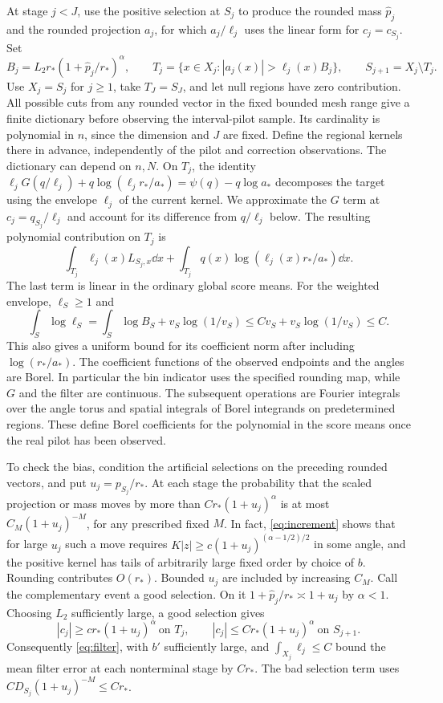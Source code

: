 At stage \(j<J\), use the positive selection at \(S_j\) to
produce the rounded mass \(\widehat p_j\) and the rounded
projection \(a_j\), for which \(a_j/\ell_j\) uses the linear
form for \(c_j=c_{S_j}\). Set
\[
 B_j=L_2 r_*(1+\widehat p_j/r_*)^\alpha,\qquad
 T_j=\{x\in X_j:|a_j(x)|>\ell_j(x)B_j\},\qquad
 S_{j+1}=X_j\setminus T_j .
\]
Use \(X_j=S_j\) for \(j\ge1\), take \(T_J=S_J\),
and let null regions have zero contribution.
All possible cuts from any rounded vector in the fixed
bounded mesh range give a finite dictionary before observing
the interval-pilot sample. Its cardinality is polynomial in \(n\), since
the dimension and \(J\) are fixed. Define the regional kernels
there in advance, independently of the pilot and correction
observations. The dictionary can depend on \(n,N\).
On \(T_j\), the identity
\(\ell_j G(q/\ell_j)+q\log(\ell_j r_*/a_*)=\psi(q)-q\log a_*\)
decomposes the target using the envelope \(\ell_j\) of the
current kernel. We approximate the \(G\) term at \(c_j=q_{S_j}/\ell_j\)
and account for its difference from \(q/\ell_j\) below.
The resulting polynomial contribution on \(T_j\) is
\begin{equation}\label{eq:piece}
 \int_{T_j}\ell_j(x)L_{S_j,x}\dd x+
 \int_{T_j}q(x)\log(\ell_j(x)r_*/a_*)\dd x .
\end{equation}
The last term is linear in the ordinary global score means.
For the weighted envelope, \(\ell_S\ge1\) and
\[
 \int_S\log\ell_S
   = \int_S\log B_S+v_S\log(1/v_S)
   \le C v_S+v_S\log(1/v_S)\le C.
\]
This also gives a uniform bound for its coefficient norm after
including \(\log(r_*/a_*)\). The coefficient functions of the observed endpoints and the
angles are Borel. In particular the bin indicator uses the
specified rounding map, while \(G\) and the filter are continuous.
The subsequent operations are Fourier integrals over the angle
torus and spatial integrals of Borel integrands on predetermined
regions. These define Borel coefficients for the polynomial in
the score means once the real pilot has been observed.

To check the bias, condition the artificial selections on the
preceding rounded vectors, and put \(u_j=p_{S_j}/r_*\).
At each stage the probability that the scaled projection or mass
moves by more than \(C r_*(1+u_j)^\alpha\) is at most
\(C_M(1+u_j)^{-M}\), for any prescribed fixed \(M\).
In fact, \eqref{eq:increment} shows that for large \(u_j\)
such a move requires \(K|z|\ge c(1+u_j)^{(\alpha-1/2)/2}\)
in some angle, and the positive kernel has tails of arbitrarily
large fixed order by choice of \(b\). Rounding contributes
\(O(r_*)\). Bounded \(u_j\) are included by increasing \(C_M\).
Call the complementary event a good selection.
On it \(1+\widehat p_j/r_*\asymp1+u_j\) by \(\alpha<1\).
Choosing \(L_2\) sufficiently large, a good selection gives
\[
 |c_j|\ge c r_*(1+u_j)^\alpha\ \text{on }T_j,\qquad
 |c_j|\le C r_*(1+u_j)^\alpha\ \text{on } S_{j+1}.
\]
Consequently \eqref{eq:filter}, with \(b'\) sufficiently large,
and \(\int_{X_j}\ell_j\le C\) bound the mean filter error at
each nonterminal stage by \(C r_*\). The bad selection term
uses \(C D_{S_j}(1+u_j)^{-M}\le C r_*\).

